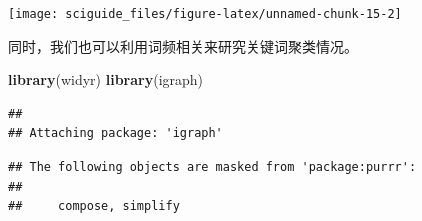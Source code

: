 \documentclass[]{tufte-book}
\newenvironment{Shaded}{}{}
\newcommand{\CommentTok}[1]{\textcolor[rgb]{0.38,0.63,0.69}{\textit{#1}}}
\newcommand{\DataTypeTok}[1]{\textcolor[rgb]{0.56,0.13,0.00}{#1}}
\newcommand{\DecValTok}[1]{\textcolor[rgb]{0.25,0.63,0.44}{#1}}
\newcommand{\KeywordTok}[1]{\textcolor[rgb]{0.00,0.44,0.13}{\textbf{#1}}}
\newcommand{\NormalTok}[1]{#1}
\newcommand{\OperatorTok}[1]{\textcolor[rgb]{0.40,0.40,0.40}{#1}}
\newcommand{\OtherTok}[1]{\textcolor[rgb]{0.00,0.44,0.13}{#1}}
\newcommand{\StringTok}[1]{\textcolor[rgb]{0.25,0.44,0.63}{#1}}
\begin{document}
\begin{Shaded}
\end{Shaded}

\texttt{[image: sciguide\_files/figure-latex/unnamed-chunk-15-2]}

同时，我们也可以利用词频相关来研究关键词聚类情况。

\begin{Shaded}
\begin{Highlighting}[]
\KeywordTok{library}\NormalTok{(widyr)}
\KeywordTok{library}\NormalTok{(igraph)}
\end{Highlighting}
\end{Shaded}

\begin{verbatim}
## 
## Attaching package: 'igraph'
\end{verbatim}

\begin{verbatim}
## The following objects are masked from 'package:purrr':
## 
##     compose, simplify
\end{verbatim}
\end{document}
